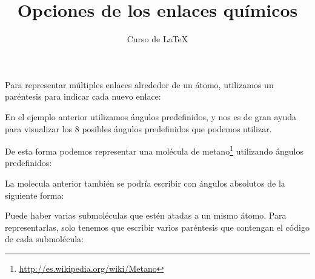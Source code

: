 \documentclass[12pt,letterpaper]{article}
\author{Curso de \LaTeX}
\title{Opciones de los enlaces químicos}
\begin{document}
\maketitle

Para representar múltiples enlaces alrededor de un átomo, utilizamos un paréntesis para indicar cada nuevo enlace:

\begin{center}
\end{center}

En el ejemplo anterior utilizamos ángulos predefinidos, y nos es de gran ayuda para visualizar los 8 posibles ángulos predefinidos que podemos utilizar.
 
De esta forma podemos representar una molécula de metano\footnote{\url{http://es.wikipedia.org/wiki/Metano}} utilizando ángulos predefinidos:

\begin{center}
\end{center}

La molecula anterior también se podría escribir con ángulos absolutos de la siguiente forma:

\begin{center}
\end{center}

Puede haber varias submoléculas que estén atadas a un mismo átomo. Para representarlas, solo tenemos que escribir varios paréntesis que contengan el código de cada submolécula:

\begin{center}
\end{center}
\end{document}
